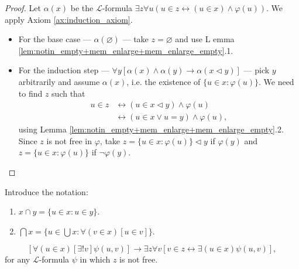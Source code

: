 \begin{proof}
    \leanok
    Let $\alpha (x)$ be the $\mathcal{L}$-formula 
    $\exists z \forall u (u\in z \leftrightarrow (u \in x) \land \varphi (u))$.
    We apply Axiom \ref{ax:induction_axiom}.
    \begin{itemize}
        \item For the base case — $\alpha (\varnothing)$ — take $z=\varnothing$ and use L
        emma \ref{lem:notin_empty+mem_enlarge+mem_enlarge_empty}.1.
        \item For the induction step 
        — $\forall y[\alpha(x) \land \alpha(y) \rightarrow \alpha(x \lhd y)]$ — 
        pick $y$ arbitrarily and assume $\alpha(x)$, i.e. 
        the existence of $ \{u \in x : \varphi (u)\}$. We need to find $z$ such that
    \begin{equation*}
    \begin{split}
        u \in z & \leftrightarrow (u \in x \lhd y) \land \varphi (u)\\
        & \leftrightarrow (u \in x \lor u = y) \land \varphi (u),
    \end{split}
    \end{equation*}
    using Lemma \ref{lem:notin_empty+mem_enlarge+mem_enlarge_empty}.2.
    Since $z$ is not free in $\varphi$, take $z = \{u \in x : \varphi (u)\} \lhd y$ if $\varphi(y)$ 
    and $z=\{u \in x : \varphi (u)\}$ if $\neg \varphi(y)$.
    \end{itemize}
\end{proof}

\begin{definition}[Intersection]
    \label{def:inter+sInter}
    \leanok
    Introduce the notation:
    \begin{enumerate}
        \item $x \cap y = \{u \in x : u \in y\}$.
        \item $\bigcap x = \{u \in \bigcup x : \forall (v \in x)[u \in v] \}$.
    \end{enumerate}  
\end{definition}

\begin{theorem}
    \label{thm:repl_scheme}
    $$[\forall (u \in x) [\exists! v] \psi (u,v)]\rightarrow 
    \exists z \forall v [v\in z \leftrightarrow \exists(u \in x) \psi (u,v)],$$ 
    for any $\mathcal{L}$-formula $\psi$ in which $z$ is not free.
\end{theorem}

